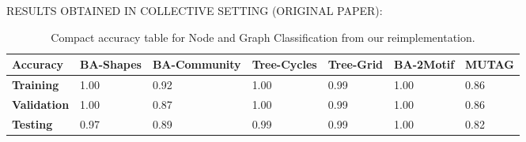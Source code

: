 






RESULTS OBTAINED IN COLLECTIVE SETTING (ORIGINAL PAPER):

\begin{table}[h]
    \centering
    \scriptsize
    \begin{tabularx}{\linewidth}{l|X X X X|X X}
    \hline
    \textbf{Accuracy} & \textbf{BA-Shapes} & \textbf{BA-Community} & \textbf{Tree-Cycles} & \textbf{Tree-Grid} & \textbf{BA-2Motif} & \textbf{MUTAG} \\
    \hline
    \textbf{Training}   & 1.00 & 0.92 & 1.00 & 0.99 & 1.00 & 0.86 \\
    \textbf{Validation} & 1.00 & 0.87 & 1.00 & 0.99 & 1.00 & 0.86 \\
    \textbf{Testing}    & 0.97 & 0.89 & 0.99 & 0.99 & 1.00 & 0.82 \\
    \hline
    \end{tabularx}
    \caption[Accuracies of higher-order GNN downstream task]{Compact accuracy table for Node and Graph Classification from our reimplementation.}
    \label{tab:compact-accuracy}
\end{table}


